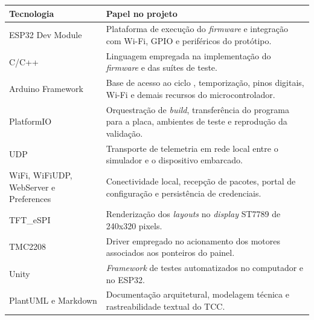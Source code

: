 \documentclass[
  12pt,
  oneside,
  a4paper,
  chapter=TITLE,
  section=TITLE,
  subsection=TITLE,
  brazil
]{abntex2}
\renewcommand{\texttt}[1]{\begingroup\ttfamily\seqsplit{#1}\endgroup}
\newcommand{\estrangeirismo}[1]{\textit{#1}}
\begin{document}
\begin{quadro}[H]
\centering
\captionsetup{
  width=\textwidth,
  justification=centering,
  singlelinecheck=true,
  font=normalsize,
  labelfont=normalfont,
  textfont=normalfont
}
\caption{Tecnologias utilizadas no projeto}
\label{quad:tecnologias_usadas}

{\fontsize{10pt}{12pt}\selectfont
\renewcommand{\arraystretch}{1.25}
\setlength{\tabcolsep}{6pt}
\begin{tabularx}{\textwidth}{|
  >{\raggedright\arraybackslash}p{3.8cm}|
  >{\raggedright\arraybackslash}X|
}
\hline
\textbf{Tecnologia} & \textbf{Papel no projeto} \\
\hline
ESP32 Dev Module & Plataforma de execução do \estrangeirismo{firmware} e integração com Wi-Fi, GPIO e periféricos do protótipo. \\
\hline
C/C++ & Linguagem empregada na implementação do \estrangeirismo{firmware} e das suítes de teste. \\
\hline
Arduino Framework & Base de acesso ao ciclo \texttt{setup/loop}, temporização, pinos digitais, Wi-Fi e demais recursos do microcontrolador. \\
\hline
PlatformIO & Orquestração de \estrangeirismo{build}, transferência do programa para a placa, ambientes de teste e reprodução da validação. \\
\hline
UDP & Transporte de telemetria em rede local entre o simulador e o dispositivo embarcado. \\
\hline
WiFi, WiFiUDP, WebServer e Preferences & Conectividade local, recepção de pacotes, portal de configuração e persistência de credenciais. \\
\hline
TFT\_eSPI & Renderização dos \estrangeirismo{layouts} no \estrangeirismo{display} ST7789 de 240x320 pixels. \\
\hline
TMC2208 & Driver empregado no acionamento dos motores associados aos ponteiros do painel. \\
\hline
Unity & \estrangeirismo{Framework} de testes automatizados no computador e no ESP32. \\
\hline
PlantUML e Markdown & Documentação arquitetural, modelagem técnica e rastreabilidade textual do TCC. \\
\hline
\end{tabularx}
}

\par\vspace{4pt}
\noindent{}

\end{quadro}
\end{document}
